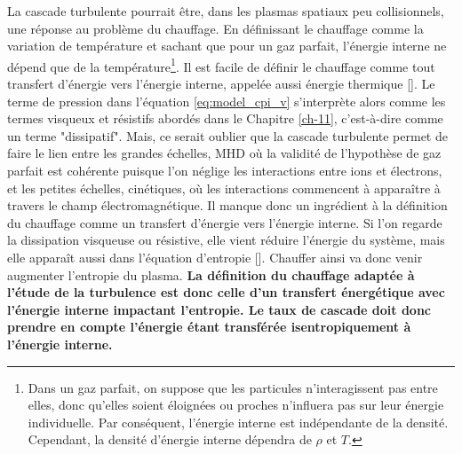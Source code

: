 La cascade turbulente pourrait être, dans les plasmas spatiaux peu collisionnels, une réponse au problème du chauffage. En définissant le chauffage comme la variation de température et sachant que pour un gaz parfait, l'énergie interne ne dépend que de la température\footnote{Dans un gaz parfait, on suppose que les particules n'interagissent pas entre elles, donc qu'elles soient éloignées ou proches n'influera pas sur leur énergie individuelle. Par conséquent, l'énergie interne est indépendante de la densité. Cependant, la densité d'énergie interne dépendra de $\rho$ et $T$.}. Il est facile de définir le chauffage comme tout transfert d'énergie vers l'énergie interne, appelée aussi énergie thermique [\cite{cassak_pressure-strain_2022}]. Le terme de pression dans l'équation \eqref{eq:model_cpi_v} s'interprète alors comme les termes visqueux et résistifs abordés dans le Chapitre \ref{ch-11}, c'est-à-dire comme un terme "dissipatif". Mais, ce serait oublier que la cascade turbulente permet de faire le lien entre les grandes échelles, MHD où la validité de l'hypothèse de gaz parfait est cohérente puisque l'on néglige les interactions entre ions et électrons, et les petites échelles, cinétiques, où les interactions commencent à apparaître à travers le champ électromagnétique. Il manque donc un ingrédient à la définition du chauffage comme un transfert d'énergie vers l'énergie interne. Si l'on regarde la dissipation visqueuse ou résistive, elle vient réduire l'énergie du système, mais elle apparaît aussi dans l'équation d'entropie [\cite{eyink_cascades_2018}]. Chauffer ainsi va donc venir augmenter l'entropie du plasma. {\bf La définition du chauffage adaptée à l'étude de la turbulence est donc celle d'un transfert énergétique avec l'énergie interne impactant l'entropie. Le taux de cascade doit donc prendre en compte l'énergie étant transférée isentropiquement à l'énergie interne.}

